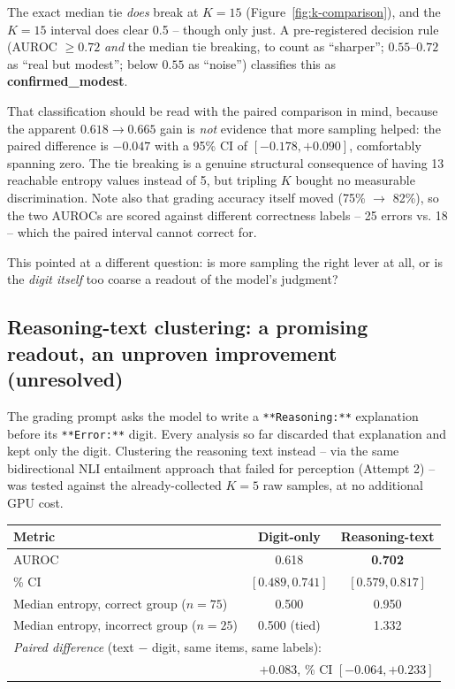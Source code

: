 \documentclass[11pt]{article}
\newcommand{\unresolved}[1]{\textcolor{darkamber}{\textbf{#1}}}
\begin{document}
The exact median tie \emph{does} break at $K=15$ (Figure~\ref{fig:k-comparison}),
and the $K=15$ interval does clear 0.5 -- though only just. A pre-registered
decision rule (AUROC $\geq 0.72$ \emph{and} the median tie breaking, to count as
``sharper''; $0.55$--$0.72$ as ``real but modest''; below $0.55$ as ``noise'')
classifies this as \textbf{confirmed\_modest}.

That classification should be read with the paired comparison in mind, because
the apparent $0.618 \rightarrow 0.665$ gain is \emph{not} evidence that more
sampling helped: the paired difference is $-0.047$ with a 95\% CI of
$[-0.178, +0.090]$, comfortably spanning zero. The tie breaking is a genuine
structural consequence of having 13 reachable entropy values instead of 5, but
tripling $K$ bought no measurable discrimination. Note also that grading
accuracy itself moved (75\% $\rightarrow$ 82\%), so the two AUROCs are scored
against different correctness labels -- 25 errors vs. 18 -- which the paired
interval cannot correct for.

This pointed at a different question: is more sampling the right lever at all,
or is the \emph{digit itself} too coarse a readout of the model's judgment?

\subsection{Reasoning-text clustering: a promising readout, an unproven improvement \unresolved{(unresolved)}}
\label{sec:reasoning-text-k5}

The grading prompt asks the model to write a \verb|**Reasoning:**| explanation
before its \verb|**Error:**| digit. Every analysis so far discarded that
explanation and kept only the digit. Clustering the reasoning text instead --
via the same bidirectional NLI entailment approach that failed for perception
(Attempt 2) -- was tested against the already-collected $K=5$ raw samples, at
no additional GPU cost.

\begin{center}
\begin{tabular}{lcc}
\toprule
Metric & Digit-only & Reasoning-text \\
\midrule
AUROC & 0.618 & \textbf{0.702} \\
\quad 95\% CI & $[0.489, 0.741]$ & $[0.579, 0.817]$ \\
Median entropy, correct group ($n=75$) & 0.500 & 0.950 \\
Median entropy, incorrect group ($n=25$) & 0.500 (tied) & 1.332 \\
\midrule
\multicolumn{3}{l}{\emph{Paired difference} (text $-$ digit, same items, same labels):} \\
\multicolumn{3}{r}{$+0.083$, \quad 95\% CI $[-0.064, +0.233]$} \\
\bottomrule
\end{tabular}
\end{center}
\end{document}

